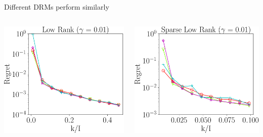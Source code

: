 \documentclass[handout,xcolor={usenames,dvipsnames}]{beamer}
\begin{document}
\begin{frame}{Different DRMs perform similarly}
\begin{columns}
	\centering
	\begin{column}{0.3\textwidth}
		\includegraphics[scale = 0.25]{fig2_lk_lnoise_600.pdf}
	\end{column}
	\begin{column}{0.3\textwidth}
		\includegraphics[scale = 0.25]{fig2_slk_lnoise_600.pdf}

\end{column}
\end{columns}
\end{frame}
\end{document}
